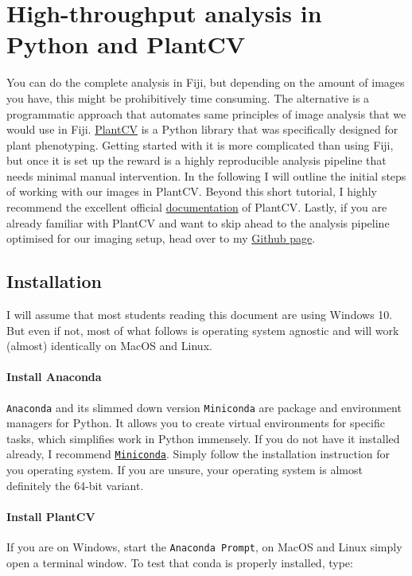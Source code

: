 \documentclass[10pt]{article}
\begin{document}
 \section{High-throughput analysis in Python and PlantCV}
 
 You can do the complete analysis in Fiji, but depending on the amount of images you have, this might be prohibitively time consuming. The alternative is a programmatic approach that automates same principles of image analysis that we would use in Fiji. \href{https://plantcv.danforthcenter.org/}{PlantCV} is a Python library that was specifically designed for plant phenotyping. Getting started with it is more complicated than using Fiji, but once it is set up the reward is a highly reproducible analysis pipeline that needs minimal manual intervention. In the following I will outline the initial steps of working with our images in PlantCV. Beyond this short tutorial, I highly recommend the excellent official \href{https://plantcv.readthedocs.io/en/stable/}{documentation} of PlantCV. Lastly, if you are already familiar with PlantCV and want to skip ahead to the analysis pipeline optimised for our imaging setup, head over to my \href{https://github.com/leonardblaschek/plantcv}{Github page}.
 
 \subsection{Installation}
 
  I will assume that most students reading this document are using Windows 10. But even if not, most of what follows is operating system agnostic and will work (almost) identically on MacOS and Linux.
  
  \paragraph{Install Anaconda}
  \texttt{Anaconda} and its slimmed down version \texttt{Miniconda} are package and environment managers for Python. It allows you to create virtual environments for specific tasks, which simplifies work in Python immensely. If you do not have it installed already, I recommend \href{https://docs.conda.io/en/latest/miniconda.html}{\texttt{Miniconda}}. Simply follow the installation instruction for you operating system. If you are unsure, your operating system is almost definitely the 64-bit variant.
  
  \paragraph{Install PlantCV}
  If you are on Windows, start the \texttt{Anaconda Prompt}, on MacOS and Linux simply open a terminal window. To test that conda is properly installed, type:
  
\end{document}
